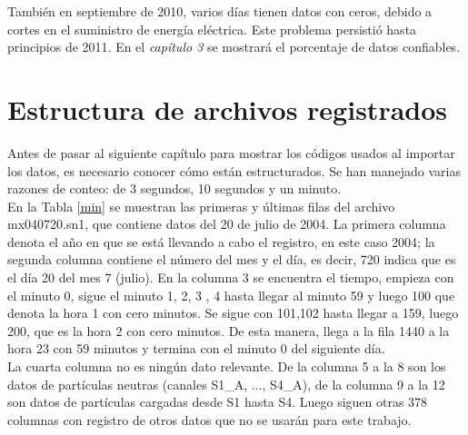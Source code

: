 También en septiembre de 2010, varios días tienen datos con ceros, debido a cortes en el suministro de energía eléctrica. Este problema persistió hasta principios de 2011. En el \emph{capítulo 3} se mostrará el porcentaje de datos confiables.\\

\section{Estructura de archivos registrados}

Antes de pasar al siguiente capítulo para mostrar los códigos usados al importar los datos, es necesario conocer cómo están estructurados. Se han manejado varias razones de conteo: de 3 segundos, 10 segundos y un minuto.\\

En la Tabla \ref{min} se muestran las primeras y últimas filas del archivo mx040720.sn1, que contiene datos del 20 de julio de 2004. La primera columna denota el año en que se está llevando a cabo el registro, en este caso 2004; la segunda columna contiene el número del mes y el día, es decir, 720 indica que es el día 20 del mes 7 (julio). En la columna 3 se encuentra el tiempo, empieza con el minuto 0, sigue el minuto 1, 2, 3 , 4 hasta llegar al minuto 59 y luego 100 que denota la hora 1 con cero minutos. Se sigue con 101,102 hasta llegar a 159, luego 200, que es la hora 2 con cero minutos. De esta manera, llega a la fila 1440 a la hora 23 con 59 minutos y termina con el minuto 0 del siguiente día.\\

La cuarta columna no es ningún dato relevante. De la columna 5 a la 8 son los datos de partículas neutras (canales S1\_A, ..., S4\_A), de la columna 9 a la 12 son datos de partículas cargadas desde S1 hasta S4. Luego siguen otras 378 columnas con registro de otros datos que no se usarán para este trabajo.\\  


